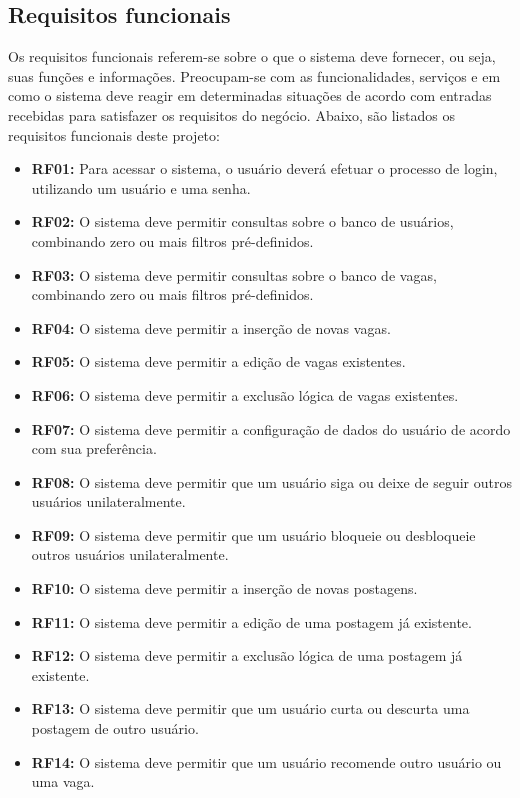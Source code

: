 \documentclass[cic,tc]{iiufrgs}
\begin{document}
\subsection{Requisitos funcionais}
\label{requisitosRF}
Os requisitos funcionais referem-se sobre o que o sistema deve fornecer, ou seja, suas funções e informações. Preocupam-se com as funcionalidades, serviços e em como o sistema deve reagir em determinadas situações de acordo com entradas recebidas para satisfazer os requisitos do negócio. Abaixo, são listados os requisitos funcionais deste projeto:  

\begin{itemize}
    \item \textbf{RF01:} Para acessar o sistema, o usuário deverá efetuar o processo de login, utilizando um usuário e uma senha.
    
    \item \textbf{RF02:} O sistema deve permitir consultas sobre o banco de usuários, combinando zero ou mais filtros pré-definidos.
    
    \item \textbf{RF03:} O sistema deve permitir consultas sobre o banco de vagas, combinando zero ou mais filtros pré-definidos.
    
    \item \textbf{RF04:} O sistema deve permitir a inserção de novas vagas.
    
    \item \textbf{RF05:} O sistema deve permitir a edição de vagas existentes.
    
    \item \textbf{RF06:} O sistema deve permitir a exclusão lógica de vagas existentes.
    
    \item \textbf{RF07:} O sistema deve permitir a configuração de dados do usuário de acordo com sua preferência.
    
    \item \textbf{RF08:} O sistema deve permitir que um usuário siga ou deixe de seguir outros usuários unilateralmente.
    
    \item \textbf{RF09:} O sistema deve permitir que um usuário bloqueie ou desbloqueie outros usuários unilateralmente.
    
    \item \textbf{RF10:} O sistema deve permitir a inserção de novas postagens.
    
    \item \textbf{RF11:} O sistema deve permitir a edição de uma postagem já existente.
    
    \item \textbf{RF12:} O sistema deve permitir a exclusão lógica de uma postagem já existente.
    
    \item \textbf{RF13:} O sistema deve permitir que um usuário curta ou descurta uma postagem de outro usuário. 
    
    \item \textbf{RF14:} O sistema deve permitir que um usuário recomende outro usuário ou uma vaga.
\end{itemize}
\end{document}
